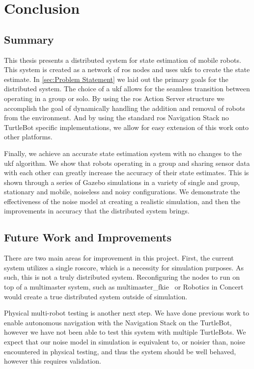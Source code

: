 \documentclass[thesis.tex]{subfile}
\begin{document}
\chapter{Conclusion} \label{Conclusion}
\section{Summary}
This thesis presents a distributed system for state estimation of mobile robots. This system is created as a network of \gls{ros} nodes and uses \glspl{ukf} to create the state estimate. In \autoref{sec:Problem Statement} we laid out the primary goals for the distributed system. The choice of a \gls{ukf} allows for the seamless transition between operating in a group or solo. By using the \gls{ros} Action Server structure we accomplish the goal of dynamically handling the addition and removal of robots from the environment. And by using the standard \gls{ros} Navigation Stack no TurtleBot specific implementations, we allow for easy extension of this work onto other platforms.

Finally, we achieve an accurate state estimation system with no changes to the \gls{ukf} algorithm. We show that robots operating in a group and sharing sensor data with each other can greatly increase the accuracy of their state estimates. This is shown through a series of Gazebo simulations in a variety of single and group, stationary and mobile, noiseless and noisy configurations. We demonstrate the effectiveness of the noise model at creating a realistic simulation, and then the improvements in accuracy that the distributed system brings.

\section{Future Work and Improvements}
There are two main areas for improvement in this project. First, the current system utilizes a single roscore, which is a necessity for simulation purposes. As such, this is not a truly distributed system. Reconfiguring the nodes to run on top of a multimaster system, such as multimaster\_fkie~\cite{Tiderko} or Robotics in Concert~\cite{StonierLeeKimEtAl2016} would create a true distributed system outside of simulation.

Physical multi-robot testing is another next step. We have done previous work to enable autonomous navigation with the Navigation Stack on the TurtleBot, however we have not been able to test this system with multiple TurtleBots. We expect that our noise model in simulation is equivalent to, or noisier than, noise encountered in physical testing, and thus the system should be well behaved, however this requires validation.
\end{document}
